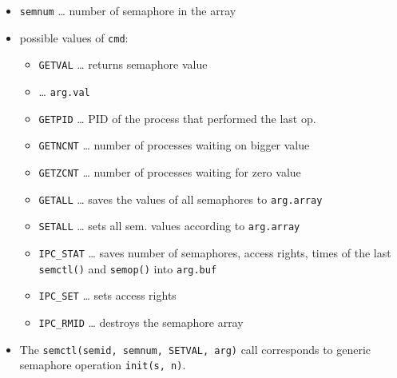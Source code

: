 
\begin{slide}
\setlength{\baselineskip}{0.9\baselineskip}
\begin{itemize}
\item \texttt{semnum} \dots{} number of semaphore in the array
\item possible values of \texttt{cmd}: 
    \begin{itemize}
    \item \texttt{GETVAL} \dots{} returns semaphore value
    \item \texttt{} \dots{} 
    \texttt{arg.val}
    \item \texttt{GETPID} \dots{} PID of the process that performed the last op.
    \item \texttt{GETNCNT} \dots{} number of processes waiting on bigger value
    \item \texttt{GETZCNT} \dots{} number of processes waiting for zero value
    \item \texttt{GETALL} \dots{} saves the values of all semaphores to
    \texttt{arg.array}
    \item \texttt{SETALL} \dots{} sets all sem. values according to
    \texttt{arg.array}
    \item \texttt{IPC\_STAT} \dots{} saves number of semaphores, access rights,
times of the last \texttt{semctl()} and \texttt{semop()} into \texttt{arg.buf}
    \item \texttt{IPC\_SET} \dots{} sets access rights
    \item \texttt{IPC\_RMID} \dots{} destroys the semaphore array
    \end{itemize}
\end{itemize}
\end{slide}

\begin{itemize}
\item The \texttt{semctl(semid, semnum, SETVAL, arg)} call corresponds to
generic semaphore operation \texttt{init(s,~n)}.
\end{itemize}


